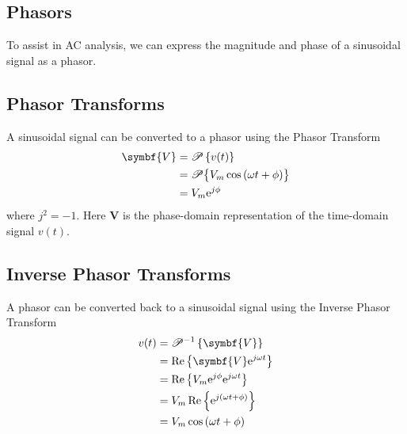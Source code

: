 \documentclass{article}
\begin{document}
\subsection{Phasors}
\begin{definition}
    To assist in AC analysis, we can express the magnitude and phase of a sinusoidal signal
    as a phasor. 
\end{definition}
\subsection{Phasor Transforms}
\begin{definition}
    A sinusoidal signal can be converted to a phasor using the Phasor Transform
    \begin{align*}
        \symbf{V} &= \mathscr{P}\left\{ v(t) \right\} \\
        &= \mathscr{P}\bigl\{ V_m\cos{\left( \omega t + \phi \right)} \bigr\} \\
        &= V_m \e^{j\phi}
    \end{align*}
    where $j^2=-1$. Here $\symbf{V}$ is the phase-domain representation of the
    time-domain signal $v(t)$.

\end{definition}
\subsection{Inverse Phasor Transforms}
\begin{definition}
    A phasor can be converted back to a sinusoidal signal using the Inverse Phasor Transform
    \begin{align*}
        v(t) &= \mathscr{P}^{-1}\left\{ \symbf{V} \right\} \\
        &= \Re\left\{ \symbf{V} \e^{j\omega t} \right\} \\
        &= \Re\left\{ V_m \e^{j\phi} \e^{j\omega t} \right\} \\
        &= V_m\Re\left\{ \e^{j\left( \omega t + \phi \right)} \right\} \\
        &= V_m\cos{\left( \omega t + \phi \right)} \\
    \end{align*}
\end{definition}
\end{document}
